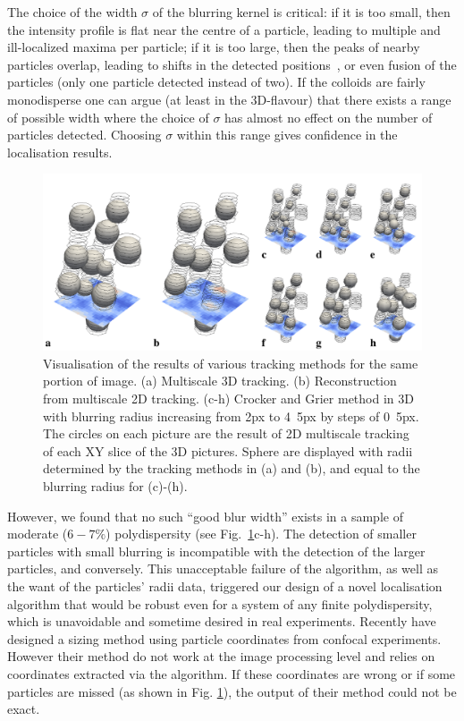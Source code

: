 \documentclass[8.5pt,twoside,twocolumn]{article}
\begin{document}
The choice of the width $\sigma$ of the blurring kernel is critical: if it is too small, then the intensity profile is flat near the centre  of a particle, leading to multiple and ill-localized maxima per particle; if it is too large, then the peaks of nearby particles overlap, leading to shifts in the detected positions~\citep{Baumgartl2005,Jenkins2008}, or even fusion of the particles (only one particle detected instead of two). If the colloids are fairly monodisperse one can argue (at least in the 3D-flavour) that there exists a range of possible width where the choice of $\sigma$ has almost no effect on the number of particles detected. Choosing $\sigma$ within this range gives confidence in the localisation results.

\begin{figure}
\centering
\includegraphics{fig_localise.pdf}
\caption{Visualisation of the results of various tracking methods for the same portion of image. (a) Multiscale 3D tracking. (b) Reconstruction from multiscale 2D tracking. (c-h)  Crocker and Grier method in 3D with blurring radius increasing from \unit{2}{px} to \unit{4.5}{px} by steps of \unit{0.5}{px}. The circles on each picture are the result of 2D multiscale tracking of each XY slice of the 3D pictures. Sphere are displayed with radii determined by the tracking methods in (a) and (b), and equal to the blurring radius for (c)-(h).}
	\label{fig:localise}
\end{figure}

However, we found that no such ``good blur width'' exists in a sample of moderate ($6-7\%$) polydispersity (see Fig.~\ref{fig:localise}c-h). The detection of smaller particles with small blurring is incompatible with the detection of the larger particles, and conversely. This unacceptable failure of the \citet{Crocker1996} algorithm, as well as the want of the particles' radii data, triggered our design of a novel localisation algorithm that would be robust even for a system of any finite polydispersity, which is unavoidable and sometime desired in real experiments. Recently \citet{Kurita2011,Kurita2011b} have designed a sizing method using particle coordinates from confocal experiments. However their method do not work at the image processing level and relies on coordinates extracted via the \citet{Crocker1996} algorithm. If these coordinates are wrong or if some particles are missed (as shown in Fig. \ref{fig:localise}), the output of their method could not be exact.
\end{document}
